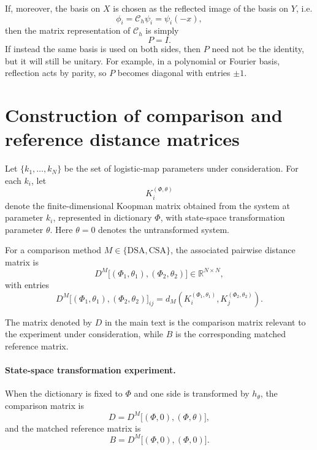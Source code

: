 \documentclass{article}
\theoremstyle{definition}
\begin{document}
If, moreover, the basis on \(X\) is chosen as the reflected image of the basis on \(Y\), i.e.
\begin{equation}
    \phi_i = \mathcal{C}_h \psi_i = \psi_i(-x),
\end{equation}
then the matrix representation of \(\mathcal{C}_h\) is simply
\begin{equation}
    P = I.
\end{equation}
If instead the same basis is used on both sides, then \(P\) need not be the identity, but it will still be unitary. For example, in a polynomial or Fourier basis, reflection acts by parity, so \(P\) becomes diagonal with entries \(\pm 1\).








\section{Construction of comparison and reference distance matrices}
\label{app:distance_matrices}

Let \(\{k_1,\dots,k_N\}\) be the set of logistic-map parameters under consideration. For each \(k_i\), let
\[
K_i^{(\Phi,\theta)}
\]
denote the finite-dimensional Koopman matrix obtained from the system at parameter \(k_i\), represented in dictionary \(\Phi\), with state-space transformation parameter \(\theta\). Here \(\theta=0\) denotes the untransformed system.

For a comparison method \(M\in\{\mathrm{DSA},\mathrm{CSA}\}\), the associated pairwise distance matrix is
\[
D^{M}\bigl[(\Phi_1,\theta_1),(\Phi_2,\theta_2)\bigr]\in\mathbb R^{N\times N},
\]
with entries
\[
D^{M}\bigl[(\Phi_1,\theta_1),(\Phi_2,\theta_2)\bigr]_{ij}
=
d_M\!\left(
K_i^{(\Phi_1,\theta_1)},
K_j^{(\Phi_2,\theta_2)}
\right).
\]

The matrix denoted by \(D\) in the main text is the comparison matrix relevant to the experiment under consideration, while \(B\) is the corresponding matched reference matrix.

\paragraph{State-space transformation experiment.}
When the dictionary is fixed to \(\Phi\) and one side is transformed by \(h_\theta\), the comparison matrix is
\[
D
=
D^{M}\bigl[(\Phi,0),(\Phi,\theta)\bigr],
\]
and the matched reference matrix is
\[
B
=
D^{M}\bigl[(\Phi,0),(\Phi,0)\bigr].
\]
\end{document}

